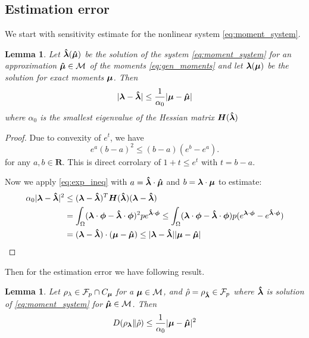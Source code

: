 \documentclass{article}
\newtheorem{lemma}[theorem]{Lemma}
\def\tn#1{\boldsymbol{#1}}
\def\R{\mathbf{R}}
\def\abs#1{|#1|}
\begin{document}
\subsection{Estimation error}
We start with sensitivity estimate for the nonlinear system \eqref{eq:moment_system}.
\begin{lemma}
\label{thm:lambda_est}
Let ${\mathbf{\boldsymbol{\hat\lambda}}}({\mathbf{\boldsymbol{\hat\mu}}})$ be the solution of the system \eqref{eq:moment_system} for an approximation 
${\mathbf{\boldsymbol{\hat\mu}}} \in \mathcal M$ of the moments \eqref{eq:gen_moments} and let ${\mathbf{\boldsymbol{\lambda}}}(\mathbf{\boldsymbol{\mu}})$ be the solution 
for exact moments $\mathbf{\boldsymbol{\mu}}$. Then
\[
   \abs{\vl - \estvl} \le \frac{1}{\alpha_0} \abs{\vmu - \estvmu} 
\]
where $\alpha_0$ is the smallest eigenvalue of the Hessian matrix $\tn H(\estvl)$
\end{lemma}
\begin{proof}
Due to convexity of $e^t$, we have
\begin{equation}
  \label{eq:exp_ineq}
  e^a(b-a)^2 \le (b -a)(e^b - e^a).
\end{equation}
for any $a, b\in \R$. This is direct corrolary of $1+t \le e^t$ with $t = b-a$.


Now we apply \eqref{eq:exp_ineq} with $a = {\mathbf{\boldsymbol{\hat\lambda}}}\cdot{\mathbf{\boldsymbol{\hat\mu}}}$ and $b={\mathbf{\boldsymbol{\lambda}}}\cdot\mathbf{\boldsymbol{\mu}}$ to estimate:
\begin{align*}
  \alpha_0 \abs{\vl - \estvl}^2 &\le  (\vl-\estvl)^T\tn H(\estvl)(\vl -\estvl)\\
  &= \int_\Omega (\vl\cdot\vphi  - \estvl\cdot\vphi)^2 pe^{\estvl\cdot\vphi}
  \le \int_{\Omega} (\vl\cdot\vphi - \estvl\cdot\vphi) 
  p(e^{\vl\cdot\vphi} - e^{\estvl\cdot\vphi})\\
  &=  (\vl - \estvl)\cdot(\vmu - \estvmu) \le \abs{\vl - \estvl}\abs{\vmu - \estvmu}
\end{align*}
\end{proof}

Then for the estimation error we have following result.
\begin{lemma}
  \label{thm:est_error}
  Let $\rho_\lambda \in \mathcal F_p \cap C_{\mathbf{\boldsymbol{\mu}}}$ for a $\mathbf{\boldsymbol{\mu}} \in \mathcal M$, 
  and $\hat\rho = \rho_{{\mathbf{\boldsymbol{\hat\lambda}}}}\in \mathcal F_p$ 
  where ${\mathbf{\boldsymbol{\hat\lambda}}}$ is solution of \eqref{eq:moment_system} for ${\mathbf{\boldsymbol{\hat\mu}}} \in \mathcal M$. Then 
  \[
    D(\rho_{\vl}\Vert \estrho) \le \frac{1}{\alpha_0} \abs{\vmu - \estvmu}^2
  \]
\end{lemma}
\end{document}
